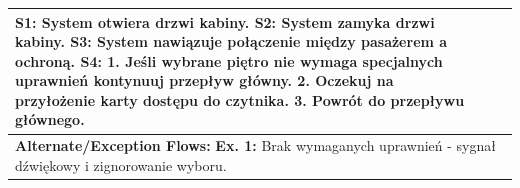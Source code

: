 \documentclass[a4paper,12pt]{article}
\begin{document}
\begin{table}[h]
\begin{tabular}{|p{}|p{}|p{}|}
{\textbf{S1:} System otwiera drzwi kabiny. \newline
\textbf{S2:} System zamyka drzwi kabiny. \newline
\textbf{S3:} System nawiązuje połączenie między pasażerem a ochroną. \newline
\textbf{S4:} 1. Jeśli wybrane piętro nie wymaga specjalnych uprawnień kontynuuj przepływ główny. \newline
             \hspace*{20pt} 2. Oczekuj na przyłożenie karty dostępu do czytnika. \newline
             \hspace*{20pt} 3. Powrót do przepływu głównego. \newline
} \\ \hline
\multicolumn{3}{|p{0.9\textwidth}|}{\textbf{Alternate/Exception Flows:} \newline
\textbf{Ex. 1:} Brak wymaganych uprawnień - sygnał dźwiękowy i zignorowanie wyboru.} \\ \hline
\end{tabular}
\end{table}
\end{document}

